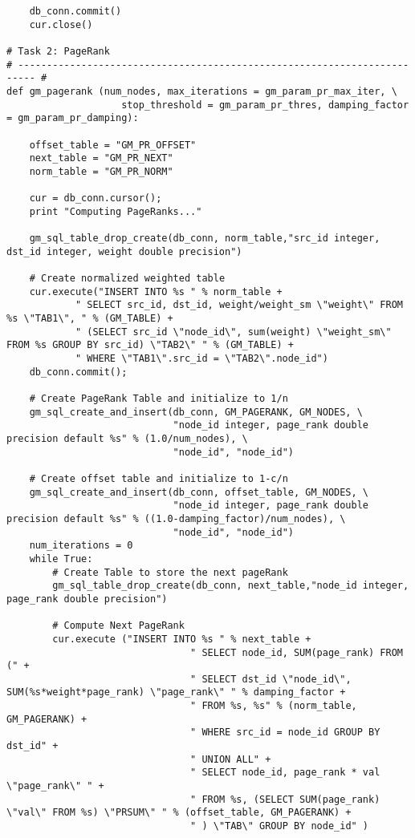 \begin{lstlisting}
    db_conn.commit()
    cur.close()

# Task 2: PageRank
# ------------------------------------------------------------------------- #
def gm_pagerank (num_nodes, max_iterations = gm_param_pr_max_iter, \
                    stop_threshold = gm_param_pr_thres, damping_factor = gm_param_pr_damping):

    offset_table = "GM_PR_OFFSET"
    next_table = "GM_PR_NEXT"
    norm_table = "GM_PR_NORM"

    cur = db_conn.cursor();
    print "Computing PageRanks..."

    gm_sql_table_drop_create(db_conn, norm_table,"src_id integer, dst_id integer, weight double precision")

    # Create normalized weighted table
    cur.execute("INSERT INTO %s " % norm_table +
            " SELECT src_id, dst_id, weight/weight_sm \"weight\" FROM %s \"TAB1\", " % (GM_TABLE) +
            " (SELECT src_id \"node_id\", sum(weight) \"weight_sm\" FROM %s GROUP BY src_id) \"TAB2\" " % (GM_TABLE) +
            " WHERE \"TAB1\".src_id = \"TAB2\".node_id")
    db_conn.commit();

    # Create PageRank Table and initialize to 1/n
    gm_sql_create_and_insert(db_conn, GM_PAGERANK, GM_NODES, \
                             "node_id integer, page_rank double precision default %s" % (1.0/num_nodes), \
                             "node_id", "node_id")

    # Create offset table and initialize to 1-c/n
    gm_sql_create_and_insert(db_conn, offset_table, GM_NODES, \
                             "node_id integer, page_rank double precision default %s" % ((1.0-damping_factor)/num_nodes), \
                             "node_id", "node_id")
    num_iterations = 0
    while True:
        # Create Table to store the next pageRank
        gm_sql_table_drop_create(db_conn, next_table,"node_id integer, page_rank double precision")

        # Compute Next PageRank
        cur.execute ("INSERT INTO %s " % next_table +
                                " SELECT node_id, SUM(page_rank) FROM (" +
                                " SELECT dst_id \"node_id\", SUM(%s*weight*page_rank) \"page_rank\" " % damping_factor +
                                " FROM %s, %s" % (norm_table, GM_PAGERANK) +
                                " WHERE src_id = node_id GROUP BY dst_id" +
                                " UNION ALL" +
                                " SELECT node_id, page_rank * val \"page_rank\" " +
                                " FROM %s, (SELECT SUM(page_rank) \"val\" FROM %s) \"PRSUM\" " % (offset_table, GM_PAGERANK) +
                                " ) \"TAB\" GROUP BY node_id" )


\end{lstlisting}
